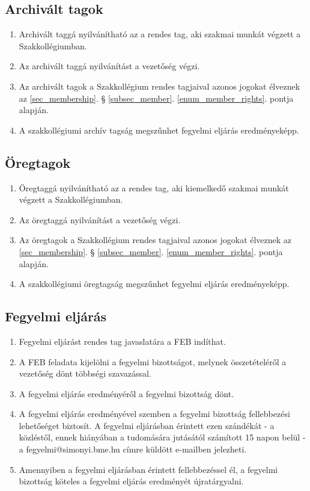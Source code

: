 \documentclass[12pt]{report}
\begin{document}
\subsection{Archivált tagok}

\begin{enumerate}
  \item Archivált taggá nyilvánítható az a rendes tag, aki szakmai munkát végzett a Szakkollégiumban.
  \item Az archivált taggá nyilvánítást a vezetőség végzi.
  \item Az archivált tagok a Szakkollégium rendes tagjaival azonos jogokat élveznek az \ref{sec_membership}. § \ref{subsec_member}. \ref{enum_member_rights}. pontja alapján.
  \item A szakkollégiumi archív tagság megszűnhet fegyelmi eljárás eredményeképp.
\end{enumerate}

\subsection{Öregtagok}

\begin{enumerate}
  \item Öregtaggá nyilvánítható az a rendes tag, aki kiemelkedő szakmai munkát végzett a Szakkollégiumban.
  \item Az öregtaggá nyilvánítást a vezetőség végzi.
  \item Az öregtagok a Szakkollégium rendes tagjaival azonos jogokat élveznek az \ref{sec_membership}. § \ref{subsec_member}. \ref{enum_member_rights}. pontja alapján.
  \item A szakkollégiumi öregtagság megszűnhet fegyelmi eljárás eredményeképp.
\end{enumerate}

\subsection{Fegyelmi eljárás}

\begin{enumerate}
  \item Fegyelmi eljárást rendes tag javaslatára a FEB indíthat.
  \item A FEB feladata kijelölni a fegyelmi bizottságot, melynek összetételéről a vezetőség dönt többségi szavazással.
  \item A fegyelmi eljárás eredményéről a fegyelmi bizottság dönt.
  \item A fegyelmi eljárás eredményével szemben a fegyelmi bizottság fellebbezési lehetőséget biztosít. A fegyelmi eljárásban érintett 
    ezen szándékát - a közléstől, ennek hiányában a tudomására jutásától számított 15 napon belül - a fegyelmi@simonyi.bme.hu címre küldött e-mailben jelezheti.
  \item Amennyiben a fegyelmi eljárásban érintett fellebbezéssel él, a fegyelmi bizottság köteles a fegyelmi eljárás eredményét újratárgyalni.
\end{enumerate}
\end{document}
